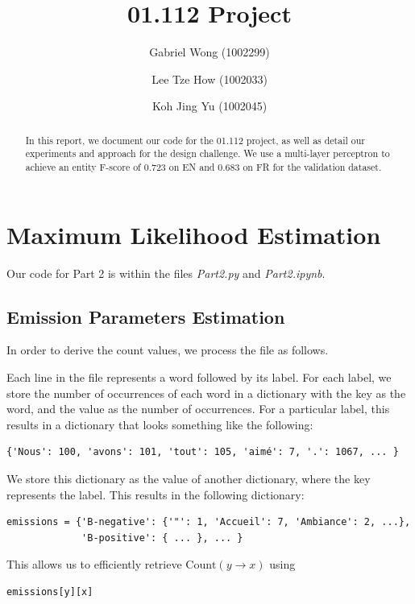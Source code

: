 \documentclass{article}
\title{01.112 Project}
\author{Gabriel Wong (1002299)
\and Lee Tze How (1002033) \and Koh Jing Yu (1002045)}
\numberwithin{equation}{section}
\begin{document}
\maketitle
\begin{abstract}
In this report, we document our code for the 01.112 project, as well as detail our experiments and approach for the design challenge. We use a multi-layer perceptron to achieve an entity F-score of 0.723 on EN and 0.683 on FR for the validation dataset.
\end{abstract}

\tableofcontents
\pagebreak

\setcounter{section}{1}

\section{Maximum Likelihood Estimation}
Our code for Part 2 is within the files \textit{Part2.py} and \textit{Part2.ipynb}.

\subsection{Emission Parameters Estimation} \label{sec:emissions}
In order to derive the count values, we process the file as follows.

Each line in the file represents a word followed by its label. For each label, we store the number of occurrences of each word in a dictionary with the key as the word, and the value as the number of occurrences. For a particular label, this results in a dictionary that looks something like the following:

\begin{verbatim}
{'Nous': 100, 'avons': 101, 'tout': 105, 'aimé': 7, '.': 1067, ... }
\end{verbatim}

We store this dictionary as the value of another dictionary, where the key represents the label. This results in the following dictionary:

\begin{verbatim}
emissions = {'B-negative': {'"': 1, 'Accueil': 7, 'Ambiance': 2, ...},
             'B-positive': { ... }, ... }
\end{verbatim}

This allows us to efficiently retrieve $\text{Count}(y \rightarrow x)$ using

\begin{verbatim}emissions[y][x]\end{verbatim}
\end{document}

